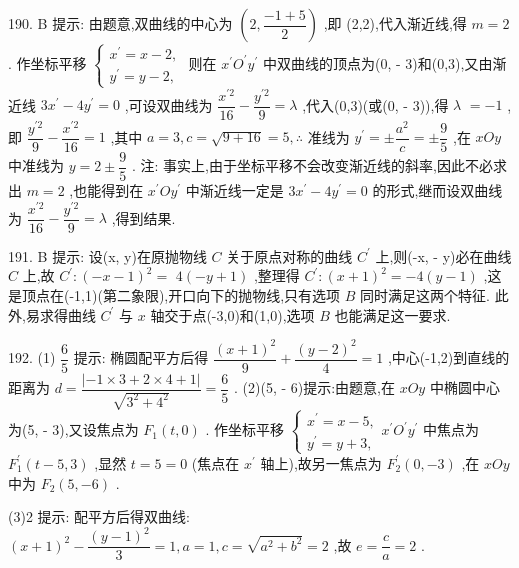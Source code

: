 190. B 提示: 由题意,双曲线的中心为 $\left( {2,\dfrac{-1 + 5}{2}}\right)$ ,即 (2,2),代入渐近线,得 $m = 2$ . 作坐标平移 $\left\{  \begin{array}{l} {x}^{\prime } = x - 2, \\  {y}^{\prime } = y - 2, \end{array}\right.$ 则在 ${x}^{\prime }{O}^{\prime }{y}^{\prime }$ 中双曲线的顶点为(0, - 3)和(0,3),又由渐近线 $3{x}^{\prime } - 4{y}^{\prime } = 0$ ,可设双曲线为 $\dfrac{{x}^{\prime 2}}{16} - \dfrac{{y}^{\prime 2}}{9} = \lambda$ ,代入(0,3)(或(0, - 3)),得 $\lambda$  $=  - 1$ ,即 $\dfrac{{y}^{\prime 2}}{9} - \dfrac{{x}^{\prime 2}}{16} = 1$ ,其中 $a = 3,c = \sqrt{9 + {16}} = 5,\therefore$ 准线为 ${y}^{\prime } =  \pm  \dfrac{{a}^{2}}{c} =  \pm  \dfrac{9}{5}$ ,在 ${xOy}$ 中准线为 $y = 2 \pm  \dfrac{9}{5}$ . 注: 事实上,由于坐标平移不会改变渐近线的斜率,因此不必求出 $m = 2$ ,也能得到在 ${x}^{\prime }O{y}^{\prime }$ 中渐近线一定是 $3{x}^{\prime } - 4{y}^{\prime } = 0$ 的形式,继而设双曲线为 $\dfrac{{x}^{\prime 2}}{16} - \dfrac{{y}^{\prime 2}}{9} = \lambda$ ,得到结果.

191. B 提示: 设(x, y)在原抛物线 $C$ 关于原点对称的曲线 ${C}^{\prime }$ 上,则(-x, - y)必在曲线 $C$ 上,故 ${C}^{\prime } : {\left( -x - 1\right) }^{2} =$  $4\left( {-y + 1}\right)$ ,整理得 ${C}^{\prime } : {\left( x + 1\right) }^{2} =  - 4\left( {y - 1}\right)$ ,这是顶点在(-1,1)(第二象限),开口向下的抛物线,只有选项 $B$ 同时满足这两个特征. 此外,易求得曲线 ${C}^{\prime }$ 与 $x$ 轴交于点(-3,0)和(1,0),选项 $B$ 也能满足这一要求.

192. (1) $\dfrac{6}{5}$ 提示: 椭圆配平方后得 $\dfrac{{\left( x + 1\right) }^{2}}{9} + \dfrac{{\left( y - 2\right) }^{2}}{4} = 1$ ,中心(-1,2)到直线的距离为 $d = \dfrac{\left| -1 \times  3 + 2 \times  4 + 1\right| }{\sqrt{{3}^{2} + {4}^{2}}} = \dfrac{6}{5}$ . (2)(5, - 6)提示:由题意,在 ${xOy}$ 中椭圆中心为(5, - 3),又设焦点为 ${F}_{1}\left( {t,0}\right)$ . 作坐标平移 $\left\{  {\begin{array}{l} {x}^{\prime } = x - 5, \\  {y}^{\prime } = y + 3, \end{array}{x}^{\prime }{O}^{\prime }{y}^{\prime }}\right.$ 中焦点为 ${F}_{1}^{\prime }\left( {t - 5,3}\right)$ ,显然 $t = 5 = 0$ (焦点在 ${x}^{\prime }$ 轴上),故另一焦点为 ${F}_{2}^{\prime }\left( {0, - 3}\right)$ ,在 ${xOy}$ 中为 ${F}_{2}\left( {5, - 6}\right)$ .

(3)2 提示: 配平方后得双曲线: ${\left( x + 1\right) }^{2} - \dfrac{{\left( y - 1\right) }^{2}}{3} = 1,a = 1,c = \sqrt{{a}^{2} + {b}^{2}} = 2$ ,故 $e = \dfrac{c}{a} = 2$ .

